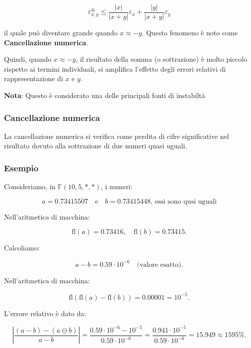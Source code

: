 \documentclass[a4paper, 11pt]{article}
\begin{document}
        \[
        \varepsilon_{x,y}^{\oplus} \leq  \frac{|x|}{|x+y|} \varepsilon_x + \frac{|y|}{|x+y|} \varepsilon_y 
        \]


        il quale può diventare grande quando \( x \approx -y \). Questo fenomeno è noto come \textbf{Cancellazione numerica}. 

        Quindi, quando \( x \approx -y \), il risultato della somma (o sottrazione) è molto piccolo rispetto ai termini individuali, si amplifica l'effetto degli errori relativi di rappresentazione di \( x \) e \( y \).

        \textbf{Nota}: Questo è considerato una delle principali fonti di instabiltà

        \subsubsection{Cancellazione numerica}

        La cancellazione numerica si verifica come perdita di cifre significative nel risultato dovuto alla sottrazione di due numeri quasi uguali.

        \subsubsection*{Esempio}

        Consideriamo, in \( \mathbb{F}(10,5,*,*) \), i numeri:


        \[
        a = 0.73415507 \quad \text{e} \quad b = 0.73415448 \text{, essi sono qusi uguali}
        \]



        Nell'aritmetica di macchina:


        \[
        \text{fl}(a) = 0.73416, \quad \text{fl}(b) = 0.73415.
        \]



        Calcoliamo:


        \[
        a - b = 0.59 \cdot 10^{-6} \quad \text{(valore esatto)}.
        \]



        Nell'aritmetica di macchina:


        \[
        \text{fl}(\text{fl}(a) - \text{fl}(b)) = 0.00001 = 10^{-5}.
        \]



        L'errore relativo è dato da:


        \[
        \left| \frac{(a - b) - (a \ominus b)}{a - b} \right| = \frac{0.59 \cdot 10^{-6} - 10^{-5}}{0.59 \cdot 10^{-6}} = \frac{0.941 \cdot 10^{-5}}{0.59 \cdot 10^{-6}} = 15.949 \approx 1595 \%.
        \]
\end{document}
